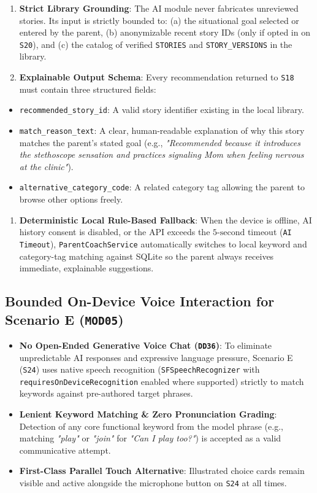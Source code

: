 \begin{enumerate}
  \item \textbf{Strict Library Grounding}: The AI module never fabricates unreviewed stories. Its input is strictly bounded to: (a) the situational goal selected or entered by the parent, (b) anonymizable recent story IDs (only if opted in on \texttt{S20}), and (c) the catalog of verified \texttt{STORIES} and \texttt{STORY\_VERSIONS} in the library.
  \item \textbf{Explainable Output Schema}: Every recommendation returned to \texttt{S18} must contain three structured fields:
\end{enumerate}
\begin{itemize}
  \item \texttt{recommended\_story\_id}: A valid story identifier existing in the local library.
  \item \texttt{match\_reason\_text}: A clear, human-readable explanation of why this story matches the parent's stated goal (e.g., \textit{"Recommended because it introduces the stethoscope sensation and practices signaling Mom when feeling nervous at the clinic"}).
  \item \texttt{alternative\_category\_code}: A related category tag allowing the parent to browse other options freely.
\end{itemize}
\begin{enumerate}
  \item \textbf{Deterministic Local Rule-Based Fallback}: When the device is offline, AI history consent is disabled, or the API exceeds the \textbf{$5\text{-second}$} timeout (\texttt{AI Timeout}), \texttt{ParentCoachService} automatically switches to local keyword and category-tag matching against SQLite so the parent always receives immediate, explainable suggestions.
\end{enumerate}



\subsection{Bounded On-Device Voice Interaction for Scenario E (\texttt{MOD05})}


\begin{itemize}
  \item \textbf{No Open-Ended Generative Voice Chat (\texttt{DD36})}: To eliminate unpredictable AI responses and expressive language pressure, Scenario E (\texttt{S24}) uses native speech recognition (\texttt{SFSpeechRecognizer} with \texttt{requiresOnDeviceRecognition} enabled where supported) strictly to match keywords against pre-authored target phrases.
  \item \textbf{Lenient Keyword Matching \& Zero Pronunciation Grading}: Detection of any core functional keyword from the model phrase (e.g., matching \textit{"play"} or \textit{"join"} for \textit{"Can I play too?"}) is accepted as a valid communicative attempt.
  \item \textbf{First-Class Parallel Touch Alternative}: Illustrated choice cards remain visible and active alongside the microphone button on \texttt{S24} at all times.
\end{itemize}



